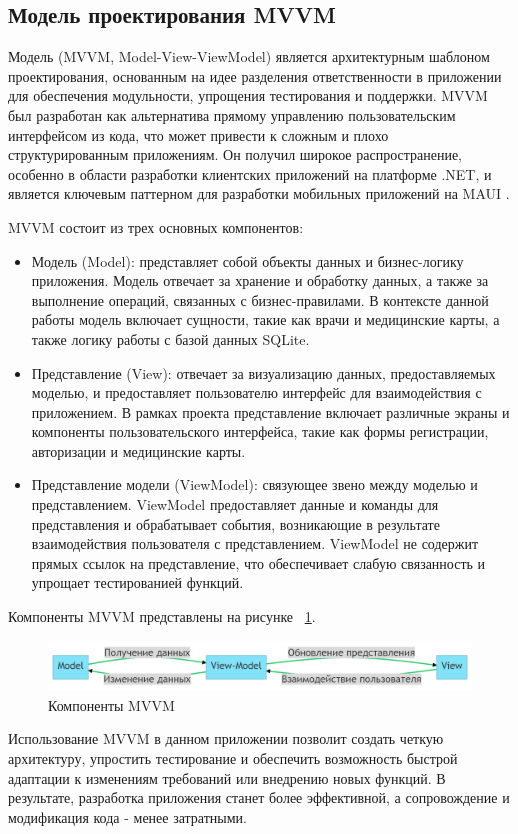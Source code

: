 \subsection{Модель проектирования MVVM}
Модель (MVVM, Model-View-ViewModel) является архитектурным шаблоном проектирования, основанным на идее разделения ответственности в приложении для обеспечения модульности, упрощения тестирования и поддержки. MVVM был разработан как альтернатива прямому управлению пользовательским интерфейсом из кода, что может привести к сложным и плохо структурированным приложениям. Он получил широкое распространение, особенно в области разработки клиентских приложений на платформе .NET, и является ключевым паттерном для разработки мобильных приложений на MAUI \cite{MVVM}. 

MVVM состоит из трех основных компонентов:
\begin{itemize}
\item Модель (Model): представляет собой объекты данных и бизнес-логику приложения. Модель отвечает за хранение и обработку данных, а также за выполнение операций, связанных с бизнес-правилами. В контексте данной работы модель включает сущности, такие как врачи и медицинские карты, а также логику работы с базой данных SQLite.

\item Представление (View): отвечает за визуализацию данных, предоставляемых моделью, и предоставляет пользователю интерфейс для взаимодействия с приложением. В рамках проекта представление включает различные экраны и компоненты пользовательского интерфейса, такие как формы регистрации, авторизации и медицинские карты.

\item Представление модели (ViewModel): связующее звено между моделью и представлением. ViewModel предоставляет данные и команды для представления и обрабатывает события, возникающие в результате взаимодействия пользователя с представлением. ViewModel не содержит прямых ссылок на представление, что обеспечивает слабую связанность и упрощает тестированией функций.
\end{itemize}

Компоненты MVVM представлены на рисунке ~\ref{fig:fig01}.

\begin{figure}
  \includegraphics[scale=0.5]{inc/mvvm_logic.png}
  \caption{Компоненты MVVM}
  \label{fig:fig01}
\end{figure}

Использование MVVM в данном приложении позволит создать четкую архитектуру, упростить тестирование и обеспечить возможность быстрой адаптации к изменениям требований или внедрению новых функций. В результате, разработка приложения станет более эффективной, а сопровождение и модификация кода - менее затратными.
